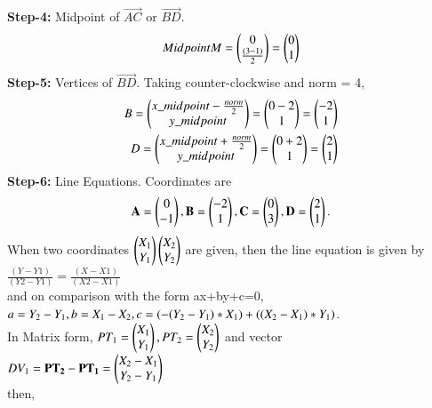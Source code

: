 \documentclass[journal,12pt,twocolumn]{IEEEtran}
\begin{document}
\textbf{Step-4:} Midpoint of $\vec{AC}$ or $\vec{BD}$.
\\
\begin{align}
\begin{split}
Midpoint M = \begin{pmatrix}0 \\ \frac{(3-1)}{2}\end{pmatrix} = \begin{pmatrix}0\\1\end{pmatrix}
\end{split}
\end{align}
\textbf{Step-5:} Vertices of $\vec{BD}$.
Taking counter-clockwise and norm = 4,
\\
\begin{align}
\begin{split}
B = \begin{pmatrix}x\_midpoint-\frac{norm}{2}\\y\_midpoint\end{pmatrix} = \begin{pmatrix}0-2\\1\end{pmatrix} = \begin{pmatrix}-2\\1\end{pmatrix}\\
D = \begin{pmatrix}x\_midpoint+\frac{norm}{2}\\y\_midpoint\end{pmatrix} = \begin{pmatrix}0+2\\1\end{pmatrix} = \begin{pmatrix}2\\1\end{pmatrix}
\end{split}
\end{align}
\textbf{Step-6:} Line Equations.
Coordinates are
\\
\begin{align}
\begin{split}
\mathbf{A} = \begin{pmatrix}0 \\ -1\end{pmatrix},
\mathbf{B} =\begin{pmatrix}-2\\1\end{pmatrix} ,
\mathbf{C} = \begin{pmatrix}0 \\ 3\end{pmatrix},
\mathbf{D} =\begin{pmatrix}2\\1\end{pmatrix}.
\end{split}
\end{align}
When two coordinates $\begin{pmatrix}X_1\\ Y_1\end{pmatrix} \begin{pmatrix}X_2 \\Y_2\end{pmatrix}$ are given, then the line equation is given by 
$\frac{(Y-Y1)}{(Y2-Y1)} = \frac{(X-X1)}{(X2-X1)}$\\
and on comparison with the form ax+by+c=0,\\ $a= Y_2-Y_1, b=X_1-X_2, \\c=(-(Y_2-Y_1)*X_1)+((X_2-X_1)*Y_1)$.\\ 
In Matrix form, $PT_1 = \begin{pmatrix}X_1\\Y_1\end{pmatrix}, PT_2 = \begin{pmatrix}X_2\\Y_2\end{pmatrix}$ and vector \\$DV_1 = \mathbf{PT_2 - PT_1} =\begin{pmatrix}X_2-X_1\\ Y_2-Y_1\end{pmatrix}$ \\then, 
\end{document}
